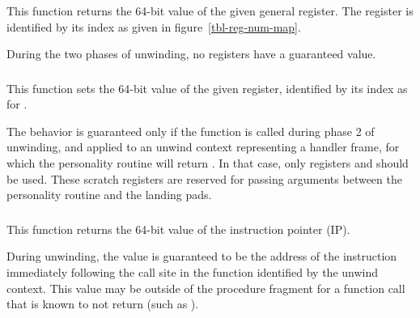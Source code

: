 This function returns the 64-bit value of the given general register.
The register is identified by its index as given in
figure~\ref{tbl-reg-num-map}.

During the two phases of unwinding, no registers have a guaranteed value.

\subsubsection{}


This function sets the 64-bit value of the given register, identified by
its index as for .

The behavior is guaranteed only if the function is called during phase 2
of unwinding, and applied to an unwind context representing a handler frame,
for which the personality routine will return .
In that case, only registers \EAX and \EDX should be used.
These scratch registers are reserved for passing arguments between the
personality routine and the landing pads.

\subsubsection{}


This function returns the 64-bit value of the instruction pointer (IP).

During unwinding, the value is guaranteed to be the address of the
instruction immediately following the call site in the function
identified by the unwind context. This value may be outside of the
procedure fragment for a function call that is known to not return
(such as ).

